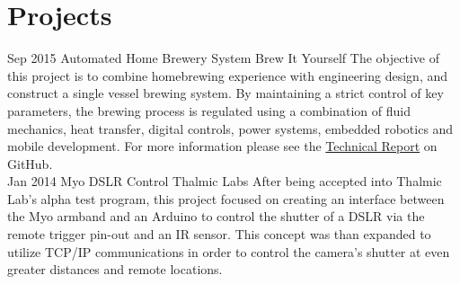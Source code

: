 \documentclass[print]{friggeri-cv} %
\begin{document}
\section{Projects}
\begin{entrylist}
\entry
{Sep 2015}
{}
{Automated Home Brewery System}
{Brew It Yourself}
{The objective of this project is to combine homebrewing experience with engineering design, and construct a single vessel brewing system. By maintaining a strict control of key parameters, the brewing process is regulated using a combination of fluid mechanics, heat transfer, digital controls, power systems, embedded robotics and mobile development.  For more information please see the \href{https://github.com/BrewItYourself/Documentation/blob/master/Final\%20Report/finalreportpdf/final-report.pdf}{Technical Report} on GitHub.}
\\
\entry
{Jan 2014}
{}
{Myo DSLR Control}
{Thalmic Labs}
{After being accepted into Thalmic Lab's alpha test program, this project focused on creating an interface between the Myo armband and an Arduino to control the shutter of a DSLR via the remote trigger pin-out and an IR sensor.  This concept was than expanded to utilize TCP/IP communications in order to control the camera's shutter at even greater distances and remote locations.}
\end{entrylist}


\end{document}

